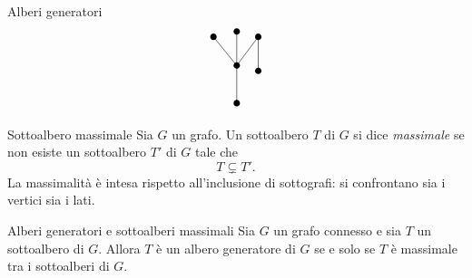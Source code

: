 \documentclass[a4paper]{article}
\begin{document}
\begin{snippetexample}{Alberi generatori}
\[\begin{tikzpicture}[
        scale=1,
        line cap=round,
        line join=round,
        v/.style={circle, fill, inner sep=1.8pt}
    ]
\begin{scope}[xshift=7.4cm]
            \coordinate (u0) at (0.65,0.2);
            \coordinate (u1) at (0,1);
            \coordinate (u2) at (0.65,1.15);
            \coordinate (u3) at (1.25,1);
            \coordinate (u4) at (1.25,0.05);
            \coordinate (u5) at (0.65,-0.85);

            \draw (u1)--(u0);
            \draw (u2)--(u0);
            \draw (u0)--(u3)--(u4);
            \draw (u0)--(u5);

            \foreach \p in {u0,u1,u2,u3,u4,u5}{
                \node[v] at (\p) {};
            }
        \end{scope}
    \end{tikzpicture}
    \]
\end{snippetexample}

\begin{snippetdefinition}{Sottoalbero massimale}
    Sia \(G\) un grafo. Un sottoalbero \(T\) di \(G\) si dice \emph{massimale} se non esiste un sottoalbero \(T'\) di \(G\) tale che
    \[
        T \subsetneq T'.
    \]
    La massimalità è intesa rispetto all'inclusione di sottografi: si confrontano sia i vertici sia i lati.
\end{snippetdefinition}

\begin{snippetproposition}{Alberi generatori e sottoalberi massimali}
    Sia \(G\) un grafo connesso e sia \(T\) un sottoalbero di \(G\). Allora \(T\) è un albero generatore di \(G\) se e solo se \(T\) è massimale tra i sottoalberi di \(G\).
\end{snippetproposition}
\end{document}
